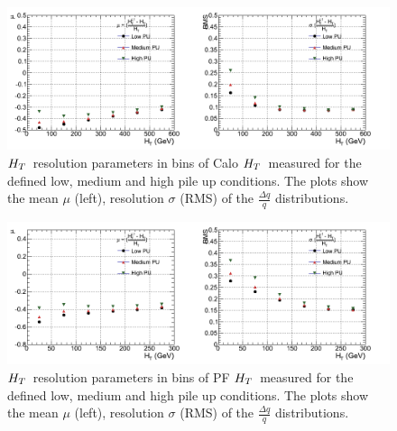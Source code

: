 \begin{figure}[h!]
  \vspace{20pt}
        \centering
        \includegraphics[width=1.0\textwidth]{plots/res_CaloHT_summary.png}
        \caption{$H_{T}$~resolution parameters in bins of Calo $H_{T}$~measured for the defined low, medium and high pile up conditions. The plots show the mean $\mu$ (left), resolution $\sigma$ (RMS) of the $\frac{\Delta q}{q}$ distributions.}
        \label{fig:calohtresultspu}
\end{figure}
\begin{figure}[h!]
  \vspace{20pt}
        \centering
        \includegraphics[width=1.0\textwidth]{plots/res_pfHT_summary.png}
        \caption{$H_{T}$~resolution parameters in bins of PF $H_{T}$~measured for the defined low, medium and high pile up conditions. The plots show the mean $\mu$ (left), resolution $\sigma$ (RMS) of the $\frac{\Delta q}{q}$ distributions.}
        \label{fig:pfhtresultspu}
\end{figure}

